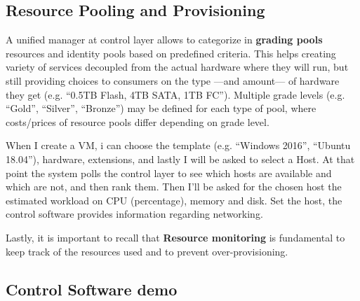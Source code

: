 \subsection{Resource Pooling and Provisioning}
A unified manager at control layer allows to categorize in \textbf{grading pools} resources and identity pools based on predefined criteria.
This helps creating variety of services decoupled from the actual hardware where they will run, but still providing choices to consumers on the type ---and amount--- of hardware they get (e.g. ``0.5TB Flash, 4TB SATA, 1TB FC'').
Multiple grade levels (e.g. ``Gold'', ``Silver'', ``Bronze'') may be defined for each type of pool, where costs/prices of resource pools differ depending on grade level.
\nl

{
   When I create a VM, i can choose the template (e.g. ``Windows 2016'', ``Ubuntu 18.04''), hardware, extensions, and lastly I will be asked to select a Host.
   At that point the system polls the control layer to see which hosts are available and which are not, and then rank them.
   Then I'll be asked for the chosen host the estimated workload on CPU (percentage), memory and disk.
   Set the host, the control software provides information regarding networking.
}

Lastly, it is important to recall that \textbf{Resource monitoring} is fundamental to keep track of the resources used and to prevent over-provisioning.

\newpage
\subsection{Control Software demo}

